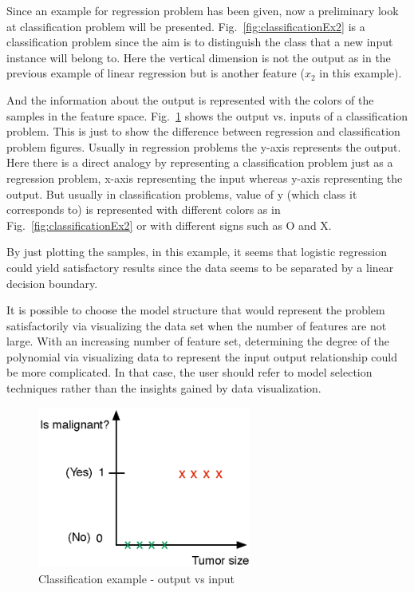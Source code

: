 Since an example for regression problem has been given, now a preliminary look at classification problem will be presented. 
Fig.~\ref{fig:classificationEx2} is a classification problem since the aim is to distinguish the class that a new input instance will belong to. 
Here the vertical dimension is not the output as in the previous example of linear regression but is another feature ($x_2$ in this example). 

And the information about the output is represented with the colors of the samples in the feature space.
Fig.~\ref{fig:classificationEx1} shows the output vs. inputs of a classification problem. 
This is just to show the difference between regression and classification problem figures. 
Usually in regression problems the y-axis represents the output. 
Here there is a direct analogy by representing a classification problem just as a regression problem, x-axis representing the input whereas y-axis representing the output. 
But usually in classification problems, value of y (which class it corresponds to) is represented with different colors as in Fig.~\ref{fig:classificationEx2} or with different signs such as O and X.

By just plotting the samples, in this example, it seems that logistic regression could yield satisfactory results since the data seems to be separated by a linear decision boundary. 

It is possible to choose the model structure that would represent the problem satisfactorily via visualizing the data set when the number of features are not large.
With an increasing number of feature set, determining the degree of the polynomial via visualizing data to represent the input output relationship could be more complicated. 
In that case, the user should refer to model selection techniques rather than the insights gained by data visualization. 


\begin{figure}
\begin{center}
\includegraphics[width=7cm]{figures/classificationEx1}    %
\caption{Classification example - output vs input} 
\label{fig:classificationEx1}
\end{center}
\end{figure}


